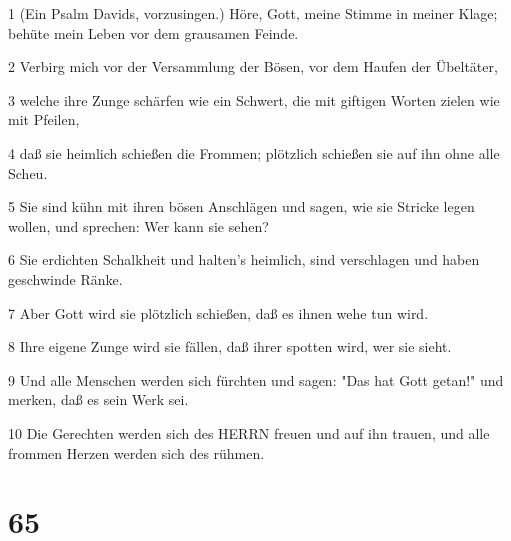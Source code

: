\par 1 (Ein Psalm Davids, vorzusingen.) Höre, Gott, meine Stimme in meiner Klage; behüte mein Leben vor dem grausamen Feinde.
\par 2 Verbirg mich vor der Versammlung der Bösen, vor dem Haufen der Übeltäter,
\par 3 welche ihre Zunge schärfen wie ein Schwert, die mit giftigen Worten zielen wie mit Pfeilen,
\par 4 daß sie heimlich schießen die Frommen; plötzlich schießen sie auf ihn ohne alle Scheu.
\par 5 Sie sind kühn mit ihren bösen Anschlägen und sagen, wie sie Stricke legen wollen, und sprechen: Wer kann sie sehen?
\par 6 Sie erdichten Schalkheit und halten's heimlich, sind verschlagen und haben geschwinde Ränke.
\par 7 Aber Gott wird sie plötzlich schießen, daß es ihnen wehe tun wird.
\par 8 Ihre eigene Zunge wird sie fällen, daß ihrer spotten wird, wer sie sieht.
\par 9 Und alle Menschen werden sich fürchten und sagen: "Das hat Gott getan!" und merken, daß es sein Werk sei.
\par 10 Die Gerechten werden sich des HERRN freuen und auf ihn trauen, und alle frommen Herzen werden sich des rühmen.

\chapter{65}

